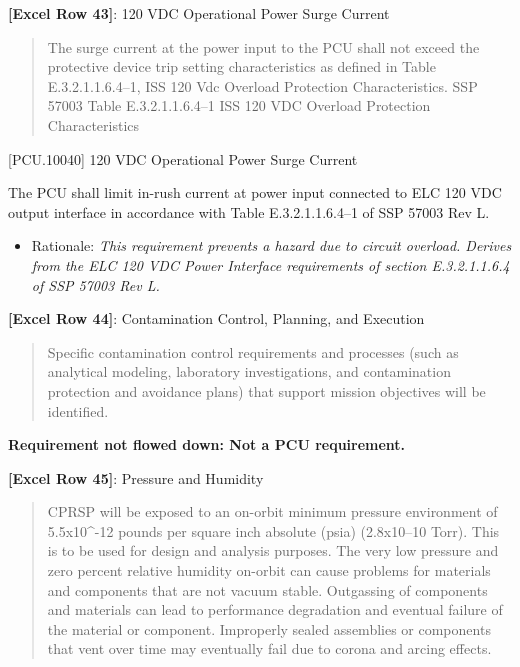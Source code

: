 \textbf{[Excel Row 43]}: 120 VDC Operational Power Surge Current

\begin{quote}
The surge current at the power input to the PCU shall not exceed the protective device trip setting characteristics as defined in Table E.3.2.1.1.6.4--1, ISS 120 Vdc Overload Protection Characteristics.
SSP 57003 Table E.3.2.1.1.6.4--1 ISS 120 VDC Overload Protection Characteristics
\end{quote}

[PCU.10040] 120 VDC Operational Power Surge Current

The PCU shall limit in-rush current at power input connected to ELC 120 VDC output interface in accordance with Table E.3.2.1.1.6.4--1 of SSP 57003 Rev L.

\begin{itemize}
\item{} Rationale: \emph{This requirement prevents a hazard due to circuit overload. Derives from the ELC 120 VDC Power Interface requirements of section E.3.2.1.1.6.4 of SSP 57003 Rev L.}

\end{itemize}

\textbf{[Excel Row 44]}: Contamination Control, Planning, and Execution

\begin{quote}
Specific contamination control requirements and processes (such as analytical modeling, laboratory investigations, and contamination protection and avoidance plans) that support mission objectives will be identified.
\end{quote}

\textbf{Requirement not flowed down: Not a PCU requirement.}

\textbf{[Excel Row 45]}: Pressure and Humidity

\begin{quote}
CPRSP will be exposed to an on-orbit minimum pressure environment of 5.5x10\^{}-12 pounds per square inch absolute (psia) (2.8x10--10 Torr). This is to be used for design and analysis purposes. The very low pressure and zero percent relative humidity on-orbit can cause problems for materials and components that are not vacuum stable. Outgassing of components and materials can lead to performance degradation and eventual failure of the material or component. Improperly sealed assemblies or components that vent over time may eventually fail due to corona and arcing effects.
\end{quote}

